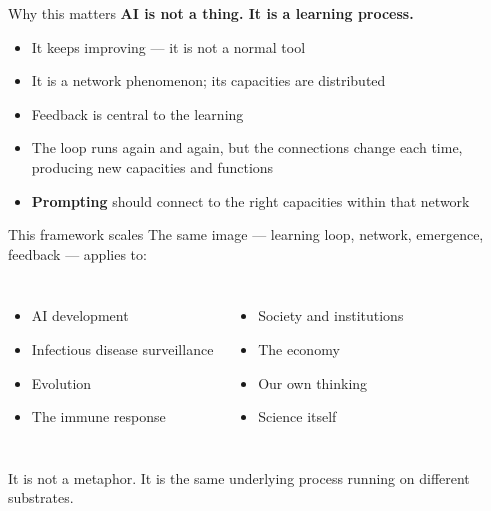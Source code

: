 \documentclass[aspectratio=169]{beamer}
\begin{document}
\begin{frame}{Why this matters}
  \textbf{AI is not a thing. It is a learning process.}

  \begin{itemize}
    \item It keeps improving --- it is not a normal tool
    \item It is a network phenomenon; its capacities are distributed
    \item Feedback is central to the learning
    \item The loop runs again and again, but the connections change each time,
          producing new capacities and functions
    \item \textbf{Prompting} should connect to the right capacities within
          that network
  \end{itemize}
\end{frame}

\begin{frame}{This framework scales}
  The same image --- learning loop, network, emergence, feedback --- applies to:

  \vspace{0.5em}
  \begin{columns}[t]
      \begin{itemize}
        \item AI development
        \item Infectious disease surveillance
        \item Evolution
        \item The immune response
      \end{itemize}
      \begin{itemize}
        \item Society and institutions
        \item The economy
        \item Our own thinking
        \item Science itself
      \end{itemize}
  \end{columns}

  \vspace{0.5em}
  It is not a metaphor. It is the same underlying process running on
  different substrates.
\end{frame}
\end{document}
